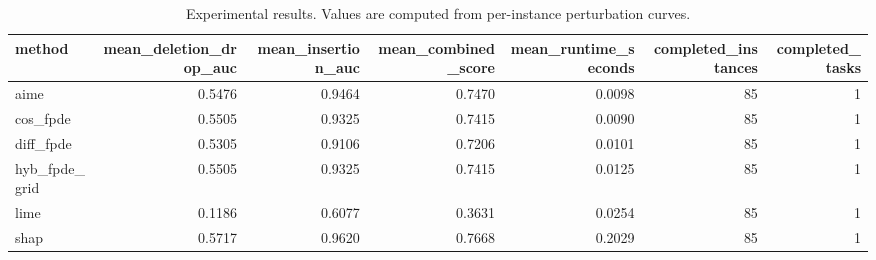 \begin{table}[t]
\caption{Experimental results. Values are computed from per-instance perturbation curves.}
\label{tab:main_results_computed}
\centering
\begin{tabular}{lrrrrrr}
\toprule
method & mean\_deletion\_drop\_auc & mean\_insertion\_auc & mean\_combined\_score & mean\_runtime\_seconds & completed\_instances & completed\_tasks \\
\midrule
aime & 0.5476 & 0.9464 & 0.7470 & 0.0098 & 85 & 1 \\
cos\_fpde & 0.5505 & 0.9325 & 0.7415 & 0.0090 & 85 & 1 \\
diff\_fpde & 0.5305 & 0.9106 & 0.7206 & 0.0101 & 85 & 1 \\
hyb\_fpde\_grid & 0.5505 & 0.9325 & 0.7415 & 0.0125 & 85 & 1 \\
lime & 0.1186 & 0.6077 & 0.3631 & 0.0254 & 85 & 1 \\
shap & 0.5717 & 0.9620 & 0.7668 & 0.2029 & 85 & 1 \\
\bottomrule
\end{tabular}

\end{table}
